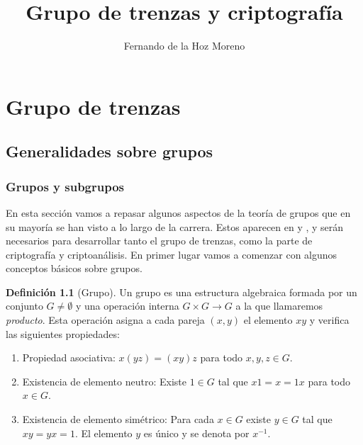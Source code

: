 \documentclass[12pt]{book}
\title{Grupo de trenzas y criptografía}
\author{Fernando de la Hoz Moreno}
\date{}
\theoremstyle{definition}
\newtheorem{defi}{Definición}[section]
\begin{document}
\maketitle
\newpage
\tableofcontents
\newpage
\part{Grupo de trenzas}
\chapter{Generalidades sobre grupos}
\section{Grupos y subgrupos}
\label{sec:grupos}
En esta sección vamos a repasar algunos aspectos de la teoría de grupos que en su mayoría se han visto a lo largo de la carrera. Estos aparecen en \cite{group} y \cite{br_gr}, y serán necesarios para desarrollar tanto el grupo de trenzas, como la parte de criptografía y criptoanálisis. En primer lugar vamos a comenzar con algunos conceptos básicos sobre grupos.

\begin{defi}[Grupo]
Un grupo es una estructura algebraica formada por un conjunto $G\neq\emptyset$ y una operación interna $G\times G\rightarrow G$ a la que llamaremos \textit{producto}. Esta operación asigna a cada pareja $(x,y)$ el elemento $xy$ y verifica las siguientes propiedades:

\begin{enumerate}
\item Propiedad asociativa: $x(yz) = (xy)z$ para todo $x,y,z\in G$.
\item Existencia de elemento neutro: Existe $1\in G$ tal que $x1= x = 1x$ para todo $ x\in G$.
\item Existencia de elemento simétrico: Para cada $x \in G$ existe $y\in G$ tal que $xy=yx = 1$. El elemento $y$ es único y se denota por $x^{-1}$.
\end{enumerate}
\end{defi}
\end{document}
